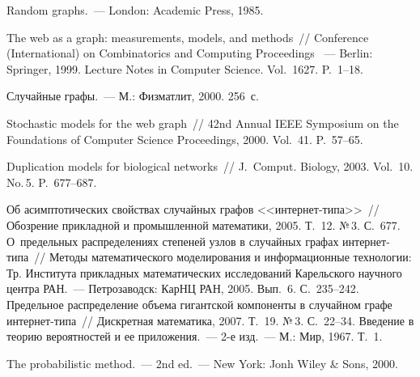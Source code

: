 \begin{multicols}{2}
{{\begin{thebibliography}{99}
 Random graphs.~--- London: Academic Press, 1985.

 The web as a graph: 
measurements, models, and methods~// Conference (International) on Combinatorics and 
Computing Proceedings ~--- Berlin: Springer, 1999. Lecture Notes in Computer Science. 
Vol.~1627. P.~1--18.

 Случайные графы.~--- М.: Физматлит, 2000. 256~с.



Stochastic models for the web graph~// 42nd Annual IEEE Symposium on the Foundations of 
Computer Science Proceedings, 2000. Vol.~41. P.~57--65. 

 Duplication models for biological networks~// 
J.~Comput. Biology, 2003. Vol.~10. No.\,5. P.~677--687. 

 Об асимптотических свойствах случайных графов 
<<ин\-тер\-нет-типа>>~// Обозрение прикладной и промышленной математики, 2005. 
Т.~12. №\,3. С.~677.
 О~предельных распределениях степеней узлов в случайных графах 
ин\-тер\-нет-типа~// Методы математического моделирования и информационные 
технологии: Тр. Института прикладных математических исследований Карельского 
научного центра РАН.~--- Петрозаводск: КарНЦ РАН, 2005. Вып.~6. С.~235--242.
 Предельное распределение объема гигантской компоненты в 
случайном графе ин\-тер\-нет-типа~// Дискретная математика, 2007. Т.~19. №\,3. 
С.~22--34.
 Введение в теорию вероятностей и ее приложения.~--- 2-е изд.~--- 
М.: Мир, 1967. Т.~1.

\label{end\stat}

 The probabilistic method.~--- 2nd ed.~--- New York: Jonh Wiley \& Sons, 
2000.
\end{thebibliography}
}
}

\end{multicols}